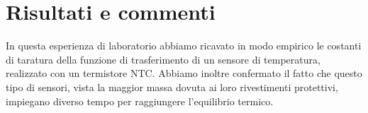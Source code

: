 \documentclass[italian,12pt,a4paper,oneside,final]{report}
\begin{document}
\newpage

\section{Risultati e commenti}
In questa esperienza di laboratorio abbiamo ricavato in modo empirico le costanti di taratura della funzione di trasferimento di un sensore di temperatura, realizzato con un termistore NTC.
Abbiamo inoltre confermato il fatto che questo tipo di sensori, vista la maggior massa dovuta ai loro rivestimenti protettivi, impiegano diverso tempo per raggiungere l'equilibrio termico.

\printbibliography[heading=bibintoc] %
\end{document}
